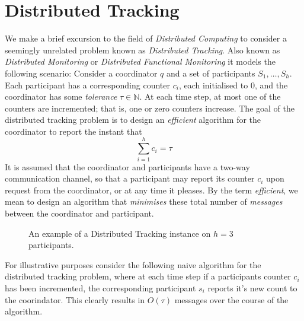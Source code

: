 \section{Distributed Tracking}
\label{sec:dist-tracking}

We make a brief excursion to the field of \textit{Distributed Computing} to consider a seemingly unrelated problem known as \textit{Distributed Tracking}. Also known as \textit{Distributed Monitoring} or \textit{Distributed Functional Monitoring} it models the following scenario: Consider a coordinator $q$ and a set of participants $S_1, \dots, S_h$. Each participant has a corresponding counter $c_i$, each initialised to 0, and the coordinator has some \textit{tolerance} $\tau \in \mathbb{N}$. At each time step, at most one of the counters are incremented; that is, one or zero counters increase. The goal of the distributed tracking problem is to design an \textit{efficient} algorithm for the coordinator to report the instant that 
$$\sum_{i=1}^{h}c_i = \tau$$
It is assumed that the coordinator and participants have a two-way communication channel, so that a participant may report its counter $c_i$ upon request from the coordinator, or at any time it pleases. By the term \textit{efficient}, we mean to design an algorithm that \textit{minimises} these total number of \textit{messages} between the coordinator and participant.


\begin{figure}
\begin{center}
\caption{An example of a Distributed Tracking instance on $h=3$ participants.}
\end{center}
\end{figure}


For illustrative purposes consider the following naive algorithm for the distributed tracking problem, where at each time step if a participants counter $c_i$ has been incremented, the corresponding participant $s_i$ reports it's new count to the coorindator. This clearly results in $O(\tau)$ messages over the course of the algorithm.


